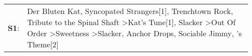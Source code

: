\begin{supertabular}{p{0.03\textwidth}p{0.92\textwidth}}
 \textbf{S1}:  &  Der Bluten Kat\textsuperscript{}, \enspace Syncopated Strangers[1]\textsuperscript{}, \enspace Trenchtown Rock\textsuperscript{}, \enspace Tribute to the Spinal Shaft\textsuperscript{} \textgreater \enspace Kat's Tune[1]\textsuperscript{}, \enspace Slacker\textsuperscript{} \textgreater \enspace Out Of Order\textsuperscript{} \textgreater \enspace Sweetness\textsuperscript{} \textgreater \enspace Slacker\textsuperscript{}, \enspace Anchor Drops\textsuperscript{}, \enspace Sociable Jimmy\textsuperscript{}, 's Theme[2]\textsuperscript{}  \enspace  \\
\end{supertabular}
